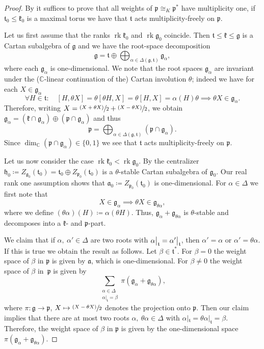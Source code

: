 \documentclass[JEP,XML,SOM,NoFloatCountersInSection,Unicode,published]{cedram}
\newcommand\mto{\mathchoice{\longmapsto}{\mapsto}{\mapsto}{\mapsto}}
\newcommand{\psfrac}[2]{\sfrac{(#1)}{#2}}
\newcommand{\brestr}[2]{#1|_{#2}}
\theoremstyle{definition}
\newcommand\restr[2]{{
\left.\kern-\nulldelimiterspace
#1
\vphantom{\big|}
\right|_{#2}
}}
\newcommand{\mf}[1]{\ensuremath{\mathfrak{#1}}}
\newcommand{\on}[1]{\ensuremath{\operatorname{#1}}}
\newcommand{\C}{\ensuremath{\mathbb{C}}}
\begin{document}
\begin{proof}
By \cite[Ch.\,IX.8, Probl.\,15]{knapplie} it suffices to prove that all weights of \hbox{$\mf p\cong_K\mf p^*$} have multiplicity one, \ie if $\mf t_0\leq\mf k_0$ is a maximal torus we have that $\mf t$ acts multiplicity-freely on $\mf p$.

Let us first assume that the ranks $\on{rk}\mf k_0$ and $\on{rk}\mf g_0$ coincide. Then $\mf t\leq\mf k\leq\mf g$ is a Cartan subalgebra of $\mf g$ and we have the root-space decomposition
\[
\mf g=\mf t\oplus\bigoplus_{\alpha\in\Delta(\mf g,\mf t)}\mf g_{\alpha},
\]
where each $\mf g_\alpha$ is one-dimensional. We note that the root spaces $\mf g_\alpha$ are invariant under the ($\C$-linear continuation of the) Cartan involution $\theta$; indeed we have for each $X\in\mf g_\alpha$
\[
\forall H\in\mf t\colon\quad[H,\theta X]=\theta[\theta H,X]=\theta[H,X]=\alpha(H)\theta \implies \theta X\in\mf g_\alpha.
\]
Therefore, writing $X=\psfrac{X+\theta X}{2}+\psfrac{X-\theta X}{2}$, we obtain $\mf g_\alpha=(\mf k\cap\mf g_\alpha)\oplus(\mf p\cap\mf g_\alpha)$ and thus
\[
\mf p=\bigoplus_{\alpha\in\Delta(\mf g,\mf t)}(\mf p\cap\mf g_\alpha).
\]
Since $\dim_\C(\mf p\cap\mf g_\alpha)\in\{0,1\}$ we see that $\mf t$ acts multiplicity-freely on $\mf p$.

Let us now consider the case $\on{rk}\mf k_0<\on{rk}\mf g_0$. By \cite[Prop.\,6.60]{knapplie} the centralizer $\mf h_0\coloneqq Z_{\mf g_0}(\mf t_0)=\mf t_0\oplus Z_{\mf p_0}(\mf t_0)$ is a $\theta$-stable Cartan subalgebra of $\mf g_0$. Our real rank one assumption shows that
$\mf a_0\coloneqq Z_{\mf p_0}(\mf t_0)$ is one-dimensional. For $\alpha\in\Delta$ we first note that
\[
X\in\mf g_\alpha \implies\theta X\in\mf g_{\theta\alpha},
\]
where we define $(\theta\alpha)(H)\coloneqq\alpha(\theta H)$. Thus, $\mf g_\alpha+\mf g_{\theta\alpha}$ is $\theta$-stable and decomposes into a $\mf k$- and $\mf p$-part.

We claim that if $\alpha,\:\alpha'\in\Delta$ are two roots with $\restr{\alpha}{\mf t}=\restr{\alpha'}{\mf t}$, then $\alpha'=\alpha$ or $\alpha'=\theta\alpha$. If this is true we obtain the result as follows. Let $\beta\in\mf t^*$. For $\beta=0$ the weight space of $\beta$ in $\mf p$ is given by $\mf a$, which is one-dimensional. For $\beta\neq0$ the weight space of $\beta$ in~$\mf p$ is given by\vspace*{-3pt}
\[
\sum_{\substack{\alpha\in\Delta\\\alpha|_{\mf t}=\beta}}\pi(\mf g_\alpha+\mf g_{\theta\alpha}),
\]
where $\pi\colon \mf g\to\mf p$, $X\mto\psfrac{X-\theta X}{2}$ denotes the projection onto $\mf p$. Then our claim implies that there are at most two roots $\alpha,\: \theta\alpha\in\Delta$ with $\brestr{\alpha}{\mf t}=\brestr{\theta\alpha}{\mf t}=\beta$. Therefore, the weight space of $\beta$ in $\mf p$ is given by the one-dimensional space $\pi(\mf g_\alpha+\mf g_{\theta\alpha})$.


\end{proof}
\end{document}
